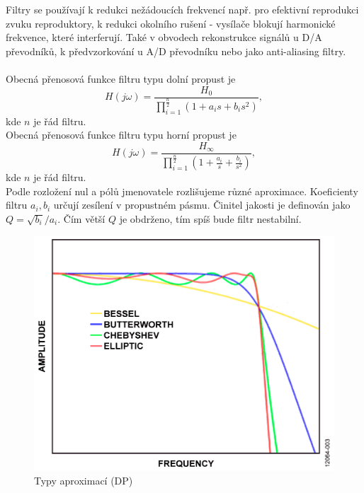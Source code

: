 \noindent Filtry se používají k redukci nežádoucích frekvencí např. pro efektivní reprodukci zvuku reproduktory, k redukci okolního rušení - vysílače blokují harmonické frekvence, které interferují. Také v obvodech rekonstrukce signálů u D/A převodníků, k předvzorkování u A/D převodníku nebo jako anti-aliasing filtry.\\\\
Obecná přenosová funkce filtru typu dolní propust je
\begin{equation}
H(j\omega) = \frac{H_0}{\prod_{i=1}^{\frac{n}{2}} (1 + a_i s + b_i s^2)},
\end{equation}
kde $n$ je řád filtru.\\
Obecná přenosová funkce filtru typu horní propust je
\begin{equation}
H(j\omega) = \frac{H_{\infty}}{\prod_{i=1}^{\frac{n}{2}} (1 + \frac{a_i}{s} + \frac{b_i}{s^2})},
\end{equation}
kde $n$ je řád filtru.\\
Podle rozložení nul a pólů jmenovatele rozlišujeme různé aproximace. Koeficienty filtru $a_i, b_i$ určují zesílení v propustném pásmu. Činitel jakosti je definován jako $Q = \sqrt{b_i}/a_i$. Čím větší $Q$ je obdrženo, tím spíš bude filtr nestabilní.
\begin{figure}[h]
\centering
\includegraphics[scale=0.3]{LGA98.png}
\caption[Typy aproximací (DP)]{Typy aproximací (DP)\cite{2}}
\end{figure}
